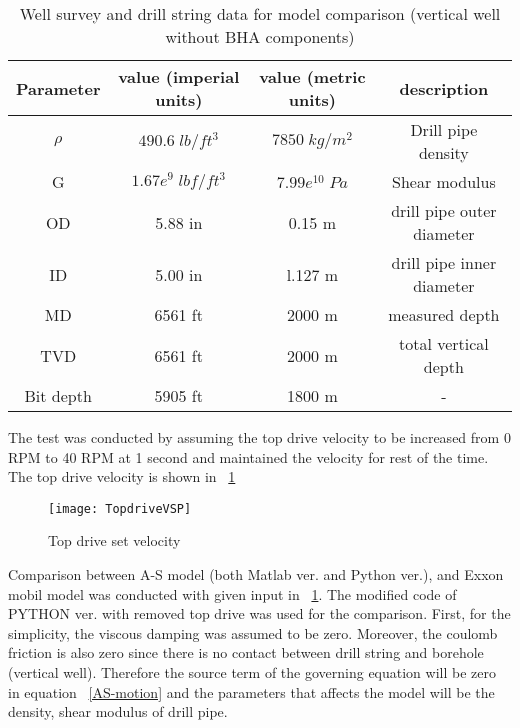 \begin{table}[!hbt]
\centering
\begin{tabular}{|c|c|c|c|}
\hline
Parameter & value (imperial units) & value (metric units) & description\\                                                              
\hline
$\rho$ & $490.6\;lb/ft^3$ & $7850\;kg/m^2$ & Drill pipe density \\                                                  
\hline
G & $1.67e^9\;lbf/ft^3$ & $7.99e^{10}\;Pa$  & Shear modulus \\                                                  
\hline
OD & 5.88 in & 0.15 m & drill pipe outer diameter\\                                                       
\hline
ID & 5.00 in & l.127 m & drill pipe inner diameter  \\                                                      
\hline
MD & 6561 ft & 2000 m & measured depth\\                                                              
\hline
TVD & 6561 ft & 2000 m & total vertical depth\\
\hline
Bit depth & 5905 ft & 1800 m & - \\ 
\hline
\end{tabular}
\caption[Well survey data for model comparison (vertical well)]{Well survey and drill string data for model comparison (vertical well without BHA components)}\label{table_verticalwell_input}
\end{table}
The test was conducted by assuming the top drive velocity to be increased from 0 RPM to 40 RPM at 1 second and maintained the velocity for rest of the time. The top drive velocity is shown in \figurename~\ref{figure_topdrive_VSP}

\begin{figure}[!hbt]
  \centering
  \texttt{[image: TopdriveVSP]}
  \caption[Top drive set velocity]{Top drive set velocity}\label{figure_topdrive_VSP}
\end{figure}

Comparison between A-S model (both Matlab ver. and Python ver.), and Exxon mobil model was conducted with given input in \tablename~\ref{table_verticalwell_input}. The modified code of PYTHON ver. with removed top drive was used for the comparison. First, for the simplicity, the viscous damping was assumed to be zero. Moreover, the coulomb friction is also zero since there is no contact between drill string and borehole (vertical well). Therefore the source term of the governing equation will be zero in equation \equationname~\ref{AS-motion} and the parameters that affects the model will be the density, shear modulus of drill pipe.

